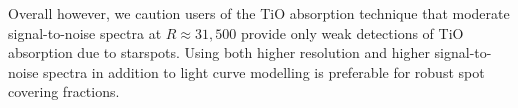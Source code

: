 Overall however, we caution users of the TiO absorption technique that moderate signal-to-noise spectra at $R\approx 31,500$ provide only weak detections of TiO absorption due to starspots. Using both higher resolution and higher signal-to-noise spectra in addition to light curve modelling \citep[as in][for example]{Gully2017} is preferable for robust spot covering fractions. 

%
%
%
%
%
%

%



